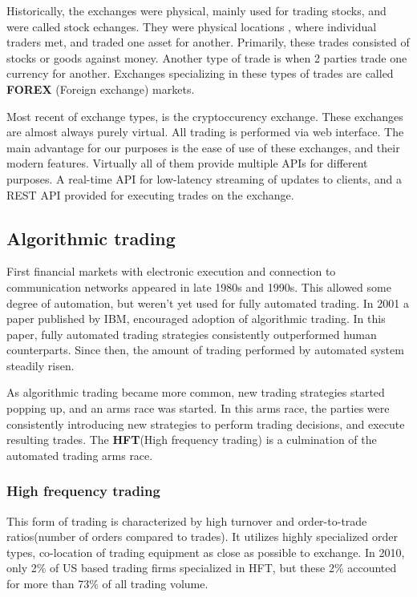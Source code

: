 Historically, the exchanges were physical, mainly used for trading stocks, and
were called stock echanges. They were physical locations , where individual traders met, and traded one asset for another.
Primarily, these trades consisted of stocks or goods against money. Another type of trade is when 2 parties trade one currency for another.
Exchanges specializing in these types of trades are called \textbf{FOREX} (Foreign exchange) markets.

Most recent of exchange types, is the cryptoccurency exchange. These exchanges are almost always purely virtual. All trading is performed
via web interface. The main advantage for our purposes is the ease of use of these exchanges, and their modern features.
Virtually all of them provide multiple APIs for different purposes. A real-time API for low-latency streaming of updates to clients,
and a REST API provided for executing trades on the exchange.

\subsection{Algorithmic trading}
First financial markets with electronic execution and connection to communication networks appeared
in late 1980s and 1990s. This allowed some degree of automation, but weren't yet used for fully
automated trading. In 2001 a paper published by IBM\cite{Tesauro:2001:HBA:501158.501183},
encouraged adoption of algorithmic trading. In this paper, fully automated trading strategies
consistently outperformed human counterparts. Since then, the amount of trading performed by
automated system steadily risen.

As algorithmic trading became more common, new trading strategies started popping up, and
an arms race was started. In this arms race, the parties were consistently introducing new
strategies to perform trading decisions, and execute resulting trades. The \textbf{HFT}(High frequency trading)
is a culmination of the automated trading arms race.

\subsubsection{High frequency trading}
This form of trading is characterized by high turnover and order-to-trade ratios(number of orders compared to trades).
It utilizes highly specialized order types, co-location of trading equipment as close as possible to exchange.
In 2010, only 2\% of US based trading firms specialized in HFT, but these 2\% accounted for more than 73\% of all
trading volume\cite{article:computerized_trading}.

